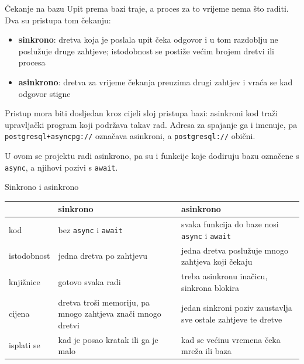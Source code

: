 \begin{frame}{Čekanje na bazu}
Upit prema bazi traje, a proces za to vrijeme nema što raditi. Dva su pristupa tom čekanju:

\begin{itemize}
  \item \textbf{sinkrono}: dretva koja je poslala upit čeka odgovor i u tom razdoblju ne poslužuje druge zahtjeve; istodobnost se postiže većim brojem dretvi ili procesa
  \item \textbf{asinkrono}: dretva za vrijeme čekanja preuzima drugi zahtjev i vraća se kad odgovor stigne
\end{itemize}

\vspace{0.5em}
Pristup mora biti dosljedan kroz cijeli sloj pristupa bazi: asinkroni kod traži upravljački program koji podržava takav rad. Adresa za spajanje ga i imenuje, pa \texttt{postgresql+asyncpg://} označava asinkroni, a \texttt{postgresql://} obični.

\vspace{0.3em}
U ovom se projektu radi asinkrono, pa su i funkcije koje dodiruju bazu označene s \texttt{async}, a njihovi pozivi s \texttt{await}.
\end{frame}

\begin{frame}{Sinkrono i asinkrono}
\begin{center}
{\small
\setlength{\tabcolsep}{6pt}
\renewcommand{\arraystretch}{1.25}
\begin{tabular}{@{}L{2.2cm}L{4.8cm}L{4.8cm}@{}}
  \toprule
   & \textbf{sinkrono} & \textbf{asinkrono} \\
  \midrule
  kod & bez \texttt{async} i \texttt{await} & svaka funkcija do baze nosi \texttt{async} i \texttt{await} \\
  istodobnost & jedna dretva po zahtjevu & jedna dretva poslužuje mnogo zahtjeva koji čekaju \\
  knjižnice & gotovo svaka radi & treba asinkronu inačicu, sinkrona blokira \\
  cijena & dretva troši memoriju, pa mnogo zahtjeva znači mnogo dretvi & jedan sinkroni poziv zaustavlja sve ostale zahtjeve te dretve \\
  isplati se & kad je posao kratak ili ga je malo & kad se većinu vremena čeka mreža ili baza \\
  \bottomrule
\end{tabular}
}
\end{center}
\end{frame}

